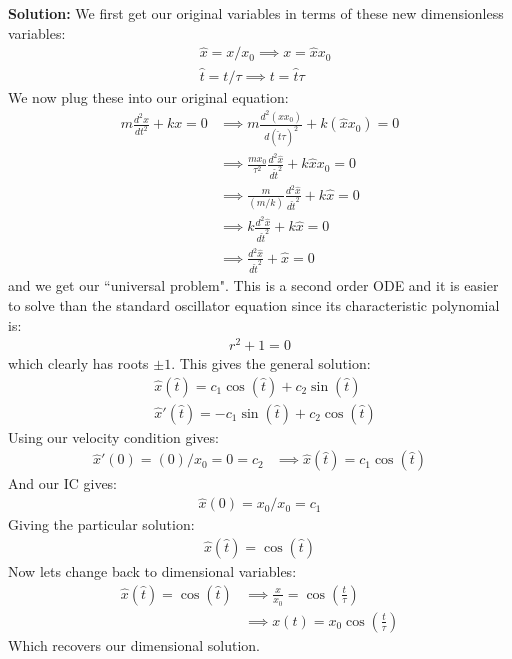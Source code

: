 {\color{red} {\bf Solution:}
We first get our original variables in terms of these new dimensionless variables:
\begin{align*}
    &\hat{x} = x/x_0 \implies x = \hat{x}x_0\\
    &\hat{t} = t/\tau  \implies t = \hat{t} \tau
\end{align*}
We now plug these into our original equation:
\begin{align*}
    m \frac{d^2 x}{dt^2} + kx = 0 & \implies m \frac{d^2 (\hat{x}x_0)}{d(\hat{t}\tau)^2} + k(\hat{x}{x_0}) = 0\\
    &\implies \frac{mx_0}{\tau^2} \frac{d^2 \hat{x}}{d \hat{t}^2} + k\hat{x}x_0 = 0\\
    &\implies \frac{m}{(m/k)} \frac{d^2 \hat{x}}{d \hat{t}^2} + k\hat{x} = 0\\
    &\implies k \frac{d^2 \hat{x}}{d \hat{t}^2} + k\hat{x} = 0\\
    &\implies  \frac{d^2 \hat{x}}{d \hat{t}^2} + \hat{x} = 0
\end{align*}
and we get our ``universal problem".
This is a second order ODE and it is easier to solve than the standard oscillator equation since its characteristic polynomial is:
\begin{align*}
    r^2 + 1 = 0
\end{align*}
which clearly has roots $\pm 1$. This gives the general solution:
\begin{align*}
    &\hat{x}(\hat{t}) = c_1\cos(\hat{t}) + c_2 \sin(\hat{t})\\
    &\hat{x}'(\hat{t}) = -c_1\sin(\hat{t}) + c_2 \cos(\hat{t})
\end{align*}
Using our velocity condition gives:
\begin{align*}
    \hat{x}'(0) = (0)/x_0 = 0 = c_2 & \implies \hat{x}(\hat{t}) = c_1\cos(\hat{t})
\end{align*}
And our IC gives:
\begin{align*}
    \hat{x}(0) = x_0/x_0 = c_1
\end{align*}
Giving the particular solution:
\begin{align*}
    \hat{x}(\hat{t}) = \cos(\hat{t})
\end{align*}
Now lets change back to dimensional variables:
\begin{align*}
    \hat{x}(\hat{t}) = \cos(\hat{t}) &\implies \frac{x}{x_0} = \cos(\frac{t}{\tau})\\
    &\implies x(t) = x_0\cos(\frac{t}{\tau})
\end{align*}
Which recovers our dimensional solution.
}
